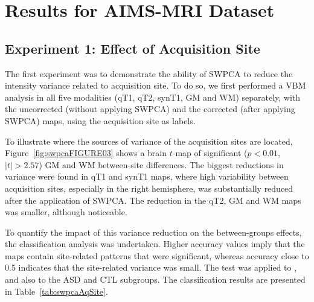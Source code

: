 \section{Results for AIMS-MRI Dataset}\label{sec:swpcaAIMSresults}
 
\subsection{Experiment 1: Effect of Acquisition Site}\label{sec:swpcaE1}
The first experiment was to demonstrate the ability of \ac{SWPCA} to reduce the intensity variance related to acquisition site. To do so, we first performed a \ac{VBM} analysis in all five modalities (\ac{qT1}, \ac{qT2}, \ac{synT1}, \ac{GM} and \ac{WM}) separately, with the uncorrected (without applying \ac{SWPCA}) and the corrected (after applying \ac{SWPCA}) maps, using the acquisition site as labels. 

To illustrate where the sources of variance of the acquisition sites are located, Figure~\ref{fig:swpcaFIGURE03} shows a brain $t$-map of significant ($p<0.01$, $|t|>2.57$) \ac{GM} and \ac{WM} between-site differences. The biggest reductions in variance were found in \ac{qT1} and \ac{synT1} maps, where high variability between acquisition sites, especially in the right hemisphere, was substantially reduced after the application of \ac{SWPCA}. The reduction in the \ac{qT2}, \ac{GM} and \ac{WM} maps was smaller, although noticeable. 

To quantify the impact of this variance reduction on the between-groups effects, the classification analysis was undertaken. Higher accuracy values imply that the maps contain site-related patterns that were significant, whereas accuracy close to 0.5 indicates that the site-related variance was small. The test was applied to \all{}, and also to the \ac{ASD} and \ac{CTL} subgroups. The classification results are presented in Table~\ref{tab:swpcaAqSite}. 
	
